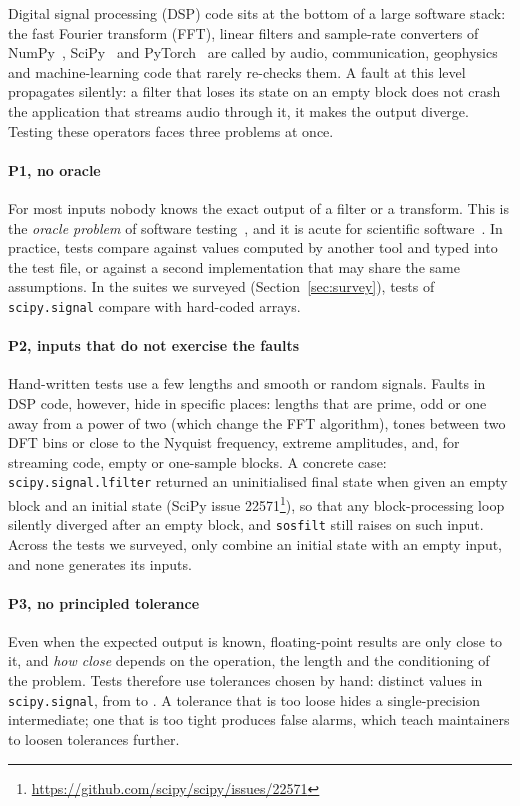 \documentclass[10pt,conference]{IEEEtran}
\newcommand{\code}[1]{\texttt{#1}}
\begin{document}
Digital signal processing (DSP) code sits at the bottom of a large software
stack: the fast Fourier transform (FFT), linear filters and sample-rate
converters of NumPy~\cite{harris2020numpy}, SciPy~\cite{virtanen2020scipy} and
PyTorch~\cite{paszke2019pytorch} are called by audio, communication,
geophysics and machine-learning code that rarely re-checks them. A fault at
this level propagates silently: a filter that loses its state on an empty
block does not crash the application that streams audio through it, it makes
the output diverge. Testing these operators faces three problems at once.

\paragraph*{P1, no oracle} For most inputs nobody knows the exact output of a
filter or a transform. This is the \emph{oracle problem} of software
testing~\cite{barr2015oracle}, and it is acute for scientific
software~\cite{kanewala2014scientific}. In practice, tests compare against
values computed by another tool and typed into the test file, or against a
second implementation that may share the same assumptions. In the suites we
surveyed (Section~\ref{sec:survey}), \surveyScipyHardcoded{} tests of
\code{scipy.signal} compare with hard-coded arrays.

\paragraph*{P2, inputs that do not exercise the faults} Hand-written tests use
a few lengths and smooth or random signals. Faults in DSP code, however, hide in
specific places: lengths that are prime, odd or one away from a power of two
(which change the FFT algorithm), tones between two DFT bins or close to the
Nyquist frequency, extreme amplitudes, and, for streaming code, empty or
one-sample blocks. A concrete case: \code{scipy.signal.lfilter} returned an
uninitialised final state when given an empty block and an initial state
(SciPy issue 22571\footnote{\url{https://github.com/scipy/scipy/issues/22571}}),
so that any block-processing loop silently diverged after an empty block, and
\code{sosfilt} still raises on such input. Across the \surveyTotalTests{} tests
we surveyed, only \surveyZiEmpty{} combine an initial state with an empty
input, and none generates its inputs.

\paragraph*{P3, no principled tolerance} Even when the expected output is
known, floating-point results are only close to it, and \emph{how close} depends
on the operation, the length and the conditioning of the problem. Tests
therefore use tolerances chosen by hand: \surveyScipyDistinctTol{} distinct
values in \code{scipy.signal}, from \surveyScipyTolMin{} to \surveyScipyTolMax.
A tolerance that is too loose hides a single-precision intermediate; one that is
too tight produces false alarms, which teach maintainers to loosen tolerances
further.
\end{document}
